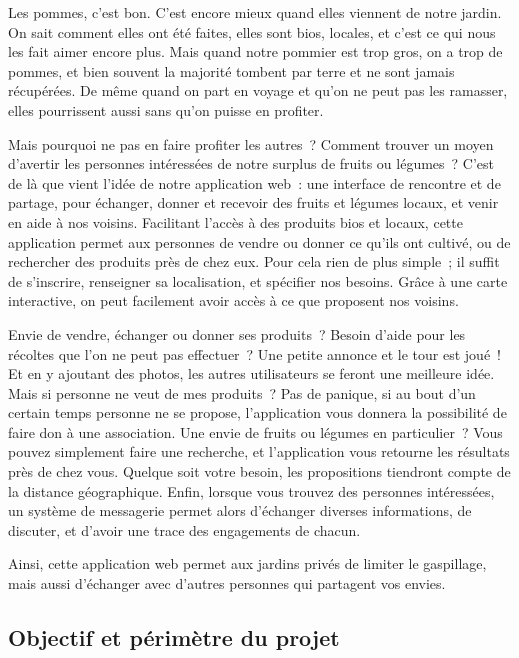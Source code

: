 \documentclass{article}
\begin{document}
Les pommes, c'est bon. C'est encore mieux quand elles viennent de notre jardin. On sait comment elles ont été faites, elles sont bios, locales, et c'est ce qui nous les fait aimer encore plus. Mais quand notre pommier est trop gros, on a trop de pommes, et bien souvent la majorité tombent par terre et ne sont jamais récupérées. De même quand on part en voyage et qu'on ne peut pas les ramasser, elles pourrissent aussi sans qu'on puisse en profiter.

Mais pourquoi ne pas en faire profiter les autres ? Comment trouver un moyen d'avertir les personnes intéressées de notre surplus de fruits ou légumes ? C'est de là que vient l'idée de notre application web : une interface de rencontre et de partage, pour échanger, donner et recevoir des fruits et légumes locaux, et venir en aide à nos voisins.
Facilitant l'accès à des produits bios et locaux, cette application permet aux personnes de vendre ou donner ce qu'ils ont cultivé, ou de rechercher des produits près de chez eux. Pour cela rien de plus simple ; il suffit de s'inscrire, renseigner sa localisation, et spécifier nos besoins. Grâce à une carte interactive, on peut facilement avoir accès à ce que proposent nos voisins.

Envie de vendre, échanger ou donner ses produits ? Besoin d'aide pour les récoltes que l'on ne peut pas effectuer ? Une petite annonce et le tour est joué ! Et en y ajoutant des photos, les autres utilisateurs se feront une meilleure idée. Mais si personne ne veut de mes produits ? Pas de panique, si au bout d'un certain temps personne ne se propose, l'application vous donnera la possibilité de faire don à une association.
Une envie de fruits ou légumes en particulier ? Vous pouvez simplement faire une recherche, et l'application vous retourne les résultats près de chez vous. Quelque soit votre besoin, les propositions tiendront compte de la distance géographique.
Enfin, lorsque vous trouvez des personnes intéressées, un système de messagerie permet alors d'échanger diverses informations, de discuter, et d'avoir une trace des engagements de chacun.

Ainsi, cette application web permet aux jardins privés de limiter le gaspillage, mais aussi d'échanger avec d'autres personnes qui partagent vos envies.

\subsection{Objectif et périmètre du projet}
\end{document}
